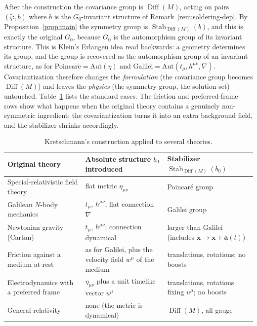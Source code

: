 \documentclass[11pt,a4paper,openany]{book}
\theoremstyle{definition}
\theoremstyle{plain}
\theoremstyle{remark}
\newcommand{\vx}{\bm{x}}
\DeclareMathOperator{\Stab}{Stab}
\DeclareMathOperator{\Diff}{Diff}
\begin{document}
After the construction the covariance group is $\Diff(M)$, acting on pairs
$(\tilde\varphi,b)$ where $b$ is the $G_0$-invariant structure of
Remark~\ref{rem:soldering-dep}. By Proposition~\ref{prop:main} the symmetry
group is $\Stab_{\Diff(M)}(b)$, and this is exactly the original $G_0$, because
$G_0$ is the automorphism group of its invariant structure. This is Klein's
Erlangen idea read backwards: a geometry determines its group, and the group
is recovered as the automorphism group of an invariant structure, as for
$\mathrm{Poincar\acute e}=\mathrm{Aut}(\eta)$ and
$\text{Galilei}=\mathrm{Aut}(t_\mu,h^{\mu\nu},\nabla)$. Covariantization
therefore changes the \emph{formulation} (the covariance group becomes
$\Diff(M)$) and leaves the \emph{physics} (the symmetry group, the solution
set) untouched. Table~\ref{tab:kretschmannize} lists the standard cases. The
friction and preferred-frame rows show what happens when the original theory
contains a genuinely non-symmetric ingredient: the covariantization turns it
into an extra background field, and the stabilizer shrinks accordingly.

\begin{table}[ht]
\centering
\small
\renewcommand{\arraystretch}{1.25}
\setlength{\tabcolsep}{4pt}
\begin{tabular}{@{}>{\raggedright\arraybackslash}p{3.7cm}%
                  >{\raggedright\arraybackslash}p{5.6cm}%
                  >{\raggedright\arraybackslash}p{5.0cm}@{}}
\toprule
Original theory & Absolute structure $b_0$ introduced & Stabilizer $\Stab_{\Diff(M)}(b_0)$\\
\midrule
Special-relativistic field theory & flat metric $\eta_{\mu\nu}$ & Poincar\'e group\\
Galilean $N$-body mechanics & $t_\mu$, $h^{\mu\nu}$, flat connection $\nabla$ & Galilei group\\
Newtonian gravity (Cartan) & $t_\mu$, $h^{\mu\nu}$; connection dynamical
  & larger than Galilei (includes $\vx\to\vx+\bm a(t)$)\\
Friction against a medium at rest & as for Galilei, plus the velocity field
  $w^\mu$ of the medium & translations, rotations; no boosts\\
Electrodynamics with a preferred frame & $\eta_{\mu\nu}$ plus a unit timelike
  vector $u^\mu$ & translations, rotations fixing $u^\mu$; no boosts\\
General relativity & none (the metric is dynamical) & $\Diff(M)$, all gauge\\
\bottomrule
\end{tabular}
\caption{Kretschmann's construction applied to several theories.}
\label{tab:kretschmannize}
\end{table}
\end{document}
